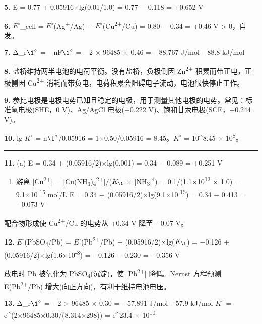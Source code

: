 \textbf{5.} E = 0.77 + 0.05916×lg(0.01/1.0) = 0.77 − 0.118 = +0.652 V

\textbf{6.} \(E^{\circ}\)\_cell = \(E^{\circ}\)(Ag\textsuperscript{+}/Ag) − \(E^{\circ}\)(Cu\textsuperscript{2+}/Cu) = 0.80 − 0.34 = +0.46 V \textgreater{} 0，自发。

\textbf{7.} Δ\_r\(\1^{\circ}\) = −nF\(\1^{\circ}\) = −2 × 96485 × 0.46 = −88,767 J/mol  −88.8 kJ/mol

\textbf{8.} 盐桥维持两半电池的电荷平衡。没有盐桥，负极侧因 Zn\textsuperscript{2+} 积累而带正电，正极侧因 Cu\textsuperscript{2+} 消耗而带负电，电荷积累会阻碍电子流动，电池很快停止工作。

\textbf{9.} 参比电极是电极电势已知且稳定的电极，用于测量其他电极的电势。常见：标准氢电极(SHE，0 V)、Ag/AgCl 电极(+0.222 V)、饱和甘汞电极(SCE，+0.244 V)。

\textbf{10.} lg \(K^{\circ}\) = n\(\1^{\circ}\)/0.05916 = 1×0.50/0.05916 = 8.45。\(K^{\circ}\) = 10\^{}8.45  × 10\textsuperscript{8}。

\begin{center}\rule{0.5\linewidth}{0.5pt}\end{center}

\textbf{11.}
(a) E = 0.34 + (0.05916/2)×lg(0.001) = 0.34 − 0.089 = +0.251 V

\begin{enumerate}
\def\labelenumi{(\alph{enumi})}
\setcounter{enumi}{1}
\tightlist
\item
  游离 {[}Cu\textsuperscript{2+}{]} = {[}Cu(NH\textsubscript{3})\textsubscript{4}\textsuperscript{2+}{]}/(\(K_{\1}\) × {[}NH\textsubscript{3}{]}\textsuperscript{4}) = 0.1/(1.1×10\textsuperscript{13} × 1.0) = 9.1×10\textsuperscript{-15} mol/L
  E = 0.34 + (0.05916/2)×lg(9.1×10\textsuperscript{-15}) = 0.34 − 0.413 = −0.073 V
\end{enumerate}

配合物形成使 Cu\textsuperscript{2+}/Cu 的电势从 +0.34 V 降至 −0.07 V。

\textbf{12.} \(E^{\circ}\)(PbSO\textsubscript{4}/Pb) = \(E^{\circ}\)(Pb\textsuperscript{2+}/Pb) + (0.05916/2)×lg(\(K_{\1}\)) = −0.126 + (0.05916/2)×lg(1.6×10\textsuperscript{-8}) = −0.126 − 0.230 = −0.356 V

放电时 Pb 被氧化为 PbSO\textsubscript{4}(沉淀)，使 {[}Pb\textsuperscript{2+}{]} 降低。Nernst 方程预测 E(Pb\textsuperscript{2+}/Pb) 增大(向正方向)，有利于维持电池电压。

\textbf{13.} Δ\_r\(\1^{\circ}\) = −2 × 96485 × 0.30 = −57,891 J/mol  −57.9 kJ/mol
\(K^{\circ}\) = e\^{}(2×96485×0.30/(8.314×298)) = e\^{}23.4  × 10\textsuperscript{10}

